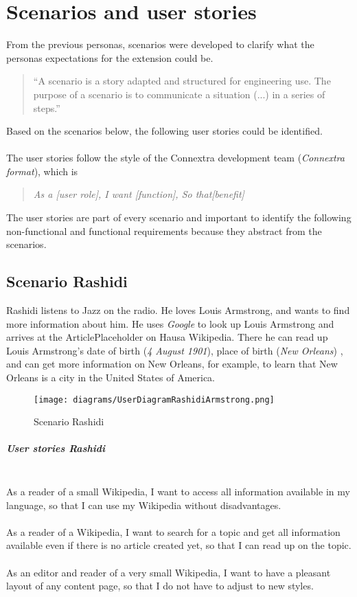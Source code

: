 \chapter{Scenarios and user stories}

From the previous personas, scenarios were developed to clarify what the personas expectations for the extension could be.
\begin{quote}
``A scenario is a story adapted and structured for engineering use. The purpose of a scenario is to communicate a situation (...) in a series of steps.'' \citep[98]{scenario} 
\end{quote}
Based on the scenarios below, the following user stories could be identified. \\
\\
The user stories follow the style of the Connextra development team (\textit{Connextra format}), which is
\begin{quote}
\textit{As a [user role], \newline I want [function], \newline So that[benefit]}
\end{quote} 
\citep{connextrastory,userstory}
The user stories are part of every scenario and important to identify the following non-functional and functional requirements because they abstract from the scenarios. 

\section{Scenario Rashidi}
Rashidi listens to Jazz on the radio. He loves Louis Armstrong, and wants to find more information about him. He uses \textit{Google} to look up Louis Armstrong and arrives at the ArticlePlaceholder on Hausa Wikipedia. There he can read up Louis Armstrong's date of birth (\textit{4 August 1901}), place of birth (\textit{New Orleans}) \citep{wd:03}, and can get more information on New Orleans, for example, to learn that New Orleans is a city in the United States of America. 
\begin{figure}[H]
	\centering
	\texttt{[image: diagrams/UserDiagramRashidiArmstrong.png]}
	\caption{Scenario Rashidi}
	\label{fig:ScenarioRashidi}
\end{figure}

\paragraph{User stories Rashidi} ~\\
As a reader of a small Wikipedia, I want to access all information available in my language, so that I can use my Wikipedia without disadvantages. \\
\\
As a reader of a Wikipedia, I want to search for a topic and get all information available even if there is no article created yet, so that I can read up on the topic. \\
\\
As an editor and reader of a very small Wikipedia, I want to have a pleasant layout of any content page, so that I do not have to adjust to new styles.

